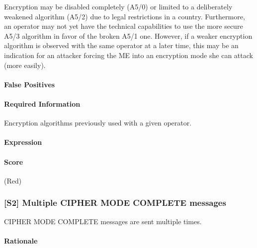 \documentclass[a4paper,11pt,notitlepage,bigheadings,oneside]{scrartcl}
\begin{document}
Encryption may be disabled completely (A5/0) or limited to a deliberately
weakened algorithm (A5/2) due to legal restrictions in a country. Furthermore,
an operator may not yet have the technical capabilities to use the more secure
A5/3 algorithm in favor of the broken A5/1 one. However, if a weaker encryption
algorithm is observed with the same operator at a later time, this may be an
indication for an attacker forcing the ME into an encryption mode she can
attack (more easily).

\paragraph{False Positives}

\TBD


\paragraph{Required Information}

Encryption algorithms previously used with a given operator.


\paragraph{Expression}

\TBD

\paragraph{Score}

\TBD{} (Red)

\subsubsection{[S2] Multiple CIPHER MODE COMPLETE messages}

CIPHER MODE COMPLETE messages are sent multiple times.

\paragraph{Rationale}

\TBD
\end{document}
